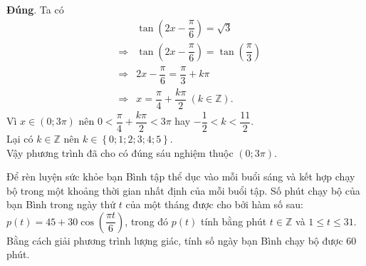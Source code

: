 \begin{ex}
{\begin{itemchoice}
			\itemch \textbf{Đúng}. Ta có \begin{eqnarray*}
				&&\tan \left(2x-\dfrac{\pi}{6} \right) =\sqrt{3}\\
				&\Rightarrow& \tan \left(2x-\dfrac{\pi}{6} \right)= \tan \left(\dfrac{\pi}{3} \right)\\
				&\Rightarrow& 2x-\dfrac{\pi}{6} =\dfrac{\pi}{3}+k\pi\\
				&\Rightarrow& x=\dfrac{\pi}{4}+\dfrac{k\pi}{2}~(k\in\mathbb{Z}).
			\end{eqnarray*}
			Vì $x\in (0;3\pi)$ nên $0<\dfrac{\pi}{4}+\dfrac{k\pi}{2}<3\pi$ hay $-\dfrac{1}{2}<k<\dfrac{11}{2}$.\\
			Lại có $k\in\mathbb{Z}$ nên $k\in \left\lbrace 0;1;2;3;4;5 \right\rbrace$.\\
			Vậy phương trình đã cho có đúng sáu nghiệm thuộc $(0;3\pi)$.  
		\end{itemchoice}
	}
\end{ex}

\begin{ex}%
Để rèn luyện sức khỏe bạn Bình tập thể dục vào mỗi buổi sáng  và kết hợp chạy bộ trong một khoảng thời gian nhất định của mỗi buổi tập. Số phút chạy bộ của bạn Bình trong ngày thứ $t$ của một tháng được cho bởi hàm số sau: $p(t)=45+30 \cos \left(\dfrac{\pi t}{6}\right)$, trong đó $p(t)$ tính bằng phút $t\in \mathbb{Z}$ và $1 \leq t \leq 31$. Bằng cách giải phương trình lượng giác, tính số ngày bạn Bình chạy bộ được $60$ phút.
\end{ex}

